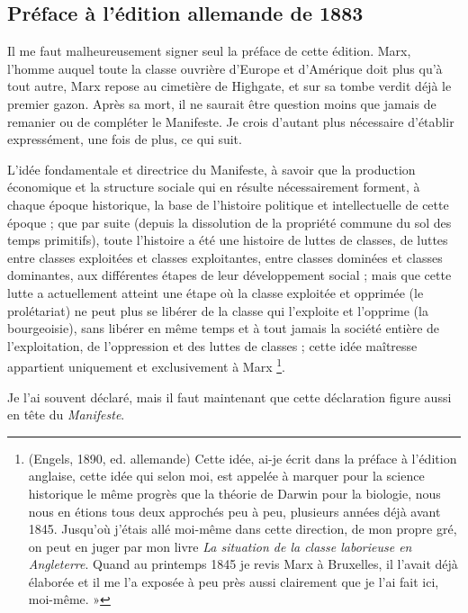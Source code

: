 \documentclass[french,twoside]{book} %
\newcommand{\byline}[1]{\bigskip{\RaggedLeft{#1}\par}\bigskip}
\begin{document}
\subsection[Préface à l’édition allemande de 1883]{Préface à l’édition allemande de 1883}
\noindent Il me faut malheureusement signer seul la préface de cette édition. Marx, l’homme auquel toute la classe ouvrière d’Europe et d’Amérique doit plus qu’à tout autre, Marx repose au cimetière de Highgate, et sur sa tombe verdit déjà le premier gazon. Après sa mort, il ne saurait être question moins que jamais de remanier ou de compléter le Manifeste. Je crois d’autant plus nécessaire d’établir expressément, une fois de plus, ce qui suit.\par
L'idée fondamentale et directrice du Manifeste, à savoir que la production économique et la structure sociale qui en résulte nécessairement forment, à chaque époque historique, la base de l’histoire politique et intellectuelle de cette époque ; que par suite (depuis la dissolution de la propriété commune du sol des temps primitifs), toute l’histoire a été une histoire de luttes de classes, de luttes entre classes exploitées et classes exploitantes, entre classes dominées et classes dominantes, aux différentes étapes de leur développement social ; mais que cette lutte a actuellement atteint une étape où la classe exploitée et opprimée (le prolétariat) ne peut plus se libérer de la classe qui l’exploite et l’opprime (la bourgeoisie), sans libérer en même temps et à tout jamais la société entière de l’exploitation, de l’oppression et des luttes de classes ; cette idée maîtresse appartient uniquement et exclusivement à Marx \footnote{\noindent (Engels, 1890, ed. allemande) Cette idée, ai-je écrit dans la préface à l’édition anglaise, cette idée qui selon moi, est appelée à marquer pour la science historique le même progrès que la théorie de Darwin pour la biologie, nous nous en étions tous deux approchés peu à peu, plusieurs années déjà avant 1845. Jusqu’où j’étais allé moi-même dans cette direction, de mon propre gré, on peut en juger par mon livre \emph{La situation de la classe laborieuse en Angleterre}. Quand au printemps 1845 je revis Marx à Bruxelles, il l’avait déjà élaborée et il me l’a exposée à peu près aussi clairement que je l’ai fait ici, moi-même. »
}.\par
Je l’ai souvent déclaré, mais il faut maintenant que cette déclaration figure aussi en tête du \emph{Manifeste}.\par

\byline{Friedrich Engels ; \\
Londres, 28 juin 1883}
\end{document}
